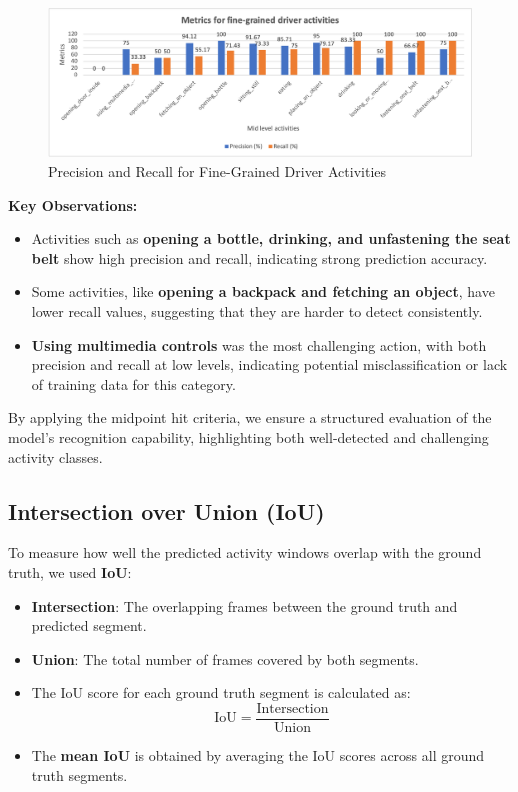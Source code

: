 \documentclass{article}
\begin{document}
\begin{figure}[h]
    \centering
    \includegraphics[width=\linewidth]{Latex Files/figs/metrics2.png}
    \caption{Precision and Recall for Fine-Grained Driver Activities}
    \label{fig:driver-activities}
\end{figure}

\textbf{Key Observations:}
\begin{itemize}
    \item Activities such as \textbf{opening a bottle, drinking, and unfastening the seat belt} show high precision and recall, indicating strong prediction accuracy.
    \item Some activities, like \textbf{opening a backpack and fetching an object}, have lower recall values, suggesting that they are harder to detect consistently.
    \item \textbf{Using multimedia controls} was the most challenging action, with both precision and recall at low levels, indicating potential misclassification or lack of training data for this category.
\end{itemize}

By applying the midpoint hit criteria, we ensure a structured evaluation of the model's recognition capability, highlighting both well-detected and challenging activity classes.

\subsection{Intersection over Union (IoU)}

To measure how well the predicted activity windows overlap with the ground truth, we used \textbf{IoU}:

\begin{itemize}
    \item \textbf{Intersection}: The overlapping frames between the ground truth and predicted segment.
    \item \textbf{Union}: The total number of frames covered by both segments.
    \item The IoU score for each ground truth segment is calculated as:
    \begin{equation}
        \text{IoU} = \frac{\text{Intersection}}{\text{Union}}
    \end{equation}
    \item The \textbf{mean IoU} is obtained by averaging the IoU scores across all ground truth segments.
\end{itemize}
\end{document}
